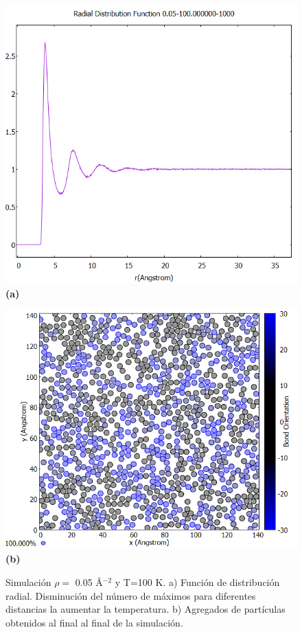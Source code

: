 \begin{figure}[H]
	\centering
	\begin{minipage}[b]{0.45\textwidth}
		\centering
		\includegraphics[width=1\textwidth]{grafico_3x14_0.05_100_rdf.png}
		\textbf{(a)}
	\end{minipage}%
	\hfill
	\begin{minipage}[b]{0.5\textwidth}
		\centering
		\includegraphics[width=1\textwidth]{grafico_3x15_0.05_100_dinamica.png}
		\textbf{(b)}
	\end{minipage}
	
	\caption{\footnotesize Simulación  $\rho=$ 0.05 \AA$^{-2}$ y  T=100 K. a) Función de distribución radial. Disminución del número de máximos para diferentes distancias la aumentar la temperatura. b) Agregados de  partículas  obtenidos al final al final de la simulación.}
	\label{fig:0.05t100}
\end{figure}

